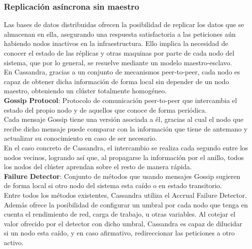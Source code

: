 \subsubsection{Replicación asíncrona sin maestro}

Las bases de datos distribuidas ofrecen la posibilidad de replicar los datos que se almacenan en ella, asegurando una respuesta satisfactoria a las peticiones aún habiendo nodos inactivos en la infraestructura. Ello implica la necesidad de conocer el estado de las réplicas y otras maquinas por parte de cada nodo del sistema, que por lo general, se resuelve mediante un modelo maestro-esclavo.\\

En Cassandra, gracias a un conjunto de mecanismos peer-to-peer, cada nodo es capaz de obtener dicha información de forma local sin depender de un nodo maestro, obteniendo un clúster totalmente homogéneo.\\ 

\textbf{Gossip Protocol}\cite{demers1987epidemic}: Protocolo de comunicación peer-to-peer que intercambia el estado del propio nodo y de aquellos que conoce de forma periódica.\\

Cada mensaje Gossip tiene una versión asociada a él, gracias al cual el nodo que recibe dicho mensaje puede comparar con la información que tiene de antemano y actualizar su conocimiento en caso de ser necesario.\\

 En el caso concreto de Cassandra, el intercambio se realiza cada segundo entre los nodos vecinos, logrando así que, al propagarse la información por el anillo, todos los nodos del clúster aprendan sobre el resto de manera rápida.\\

\textbf{Failure Detector}\cite{chandra1996unreliable}: Conjunto de métodos que usando mensajes Gossip sugieren de forma local si otro nodo del sistema esta caído o en estado transitorio.\\

Entre todos los métodos existentes, Cassandra utiliza el Accrual Failure Detector\cite{hayashibara2004spl}. Además ofrece la posibilidad de configurar un umbral por cada nodo que tenga en cuenta el rendimiento de red, carga de trabajo, u otras variables. Al cotejar el valor ofrecido por el detector con dicho umbral, Cassandra es capaz de dilucidar si un nodo esta caído, y en caso afirmativo, redireccionar las peticiones a otro activo.\\

